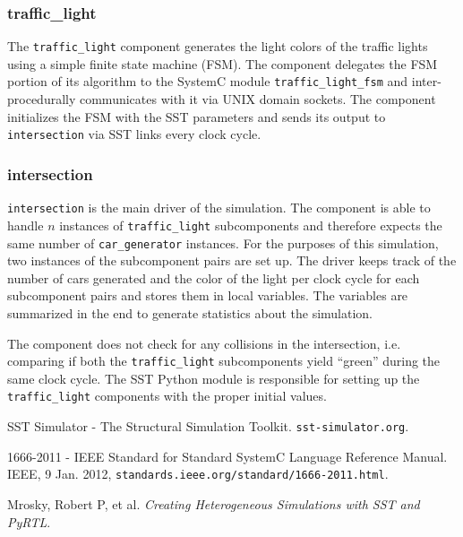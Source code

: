 \documentclass{article}
\begin{document}
      \subsubsection{traffic\_light}

      The \lstinline{traffic_light} component generates the light colors of the traffic lights using
      a simple finite state machine (FSM). The component delegates the FSM portion of its algorithm
      to the SystemC module \lstinline{traffic_light_fsm} and inter-procedurally communicates with
      it via UNIX domain sockets. The component initializes the FSM with the SST parameters and
      sends its output to \lstinline{intersection} via SST links every clock cycle.

      \subsubsection{intersection}
      \lstinline{intersection} is the main driver of the simulation. The component is able to handle
      $n$ instances of \lstinline{traffic_light} subcomponents and therefore expects the same number
      of \lstinline{car_generator} instances. For the purposes of this simulation, two instances of
      the subcomponent pairs are set up. The driver keeps track of the number of cars generated and
      the color of the light per clock cycle for each subcomponent pairs and stores them in local
      variables. The variables are summarized in the end to generate statistics about the
      simulation.

      The component does not check for any collisions in the intersection, i.e. comparing if both
      the \lstinline{traffic_light} subcomponents yield ``green'' during the same clock cycle. The
      SST Python module is responsible for setting up the \lstinline{traffic_light} components with
      the proper initial values.

  \begin{thebibliography}{5}

     SST Simulator - The Structural Simulation Toolkit. \texttt{sst-simulator.org}.

     1666-2011 - IEEE Standard for Standard SystemC Language Reference Manual. IEEE, 9 Jan. 2012, \texttt{standards.ieee.org/standard/1666-2011.html}.

     Mrosky, Robert P, et al. \textit{Creating Heterogeneous Simulations with SST and PyRTL}.


  \end{thebibliography}
\end{document}
